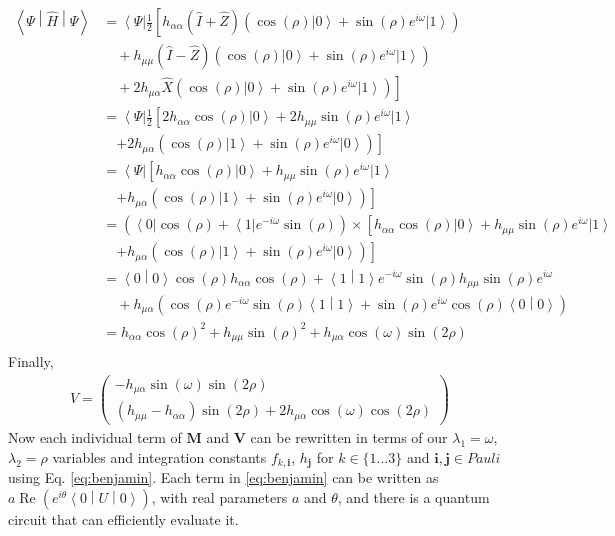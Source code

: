 \documentclass{aux/ttuthes2007}
\newcommand{\bra}[1]{\ensuremath{\left\langle#1\right\vert}}
\newcommand{\ket}[1]{\ensuremath{\left|#1\right\rangle}}
\newcommand{\braket}[2]{\left< #1 \middle\vert #2 \right>}
\newcommand{\sandwich}[3]{\left< #1 \middle\vert #2 \middle\vert #3 \right>}
\newcommand{\s}[1]{\sin\left( #1 \right)}
\newcommand{\co}[1]{\cos\left( #1 \right)}
\newcommand{\paren}[1]{\left( #1 \right)}
\begin{document}
\begin{equation*}
	\begin{split}
		\sandwich \Psi {\hat H} \Psi
		&= \bra \Psi \frac 1 2 \left[
			h_{\alpha\alpha} (\hat I + \hat Z) \paren{\co \rho \ket 0 + \s \rho e^{i\omega} \ket 1} \right .\\
		& \quad + h_{\mu\mu} (\hat I - \hat Z) \paren{\co \rho \ket 0 + \s \rho e^{i\omega} \ket 1} \\
		&\left. \quad + 2 h_{\mu\alpha} \hat X \paren{\co \rho \ket 0 + \s \rho e^{i\omega} \ket 1}
		\right] \\
		&= \bra \Psi \frac 1 2 \left[
			2h_{\alpha\alpha} \co \rho \ket 0 + 2h_{\mu\mu} \s \rho e^{i\omega} \ket 1
		\right .
		\\
		&\quad \left .
			+ 2h_{\mu\alpha} \paren{\co \rho \ket 1 + \s \rho e^{i\omega} \ket 0}
		\right] \\
		&= \bra \Psi \left[
			h_{\alpha\alpha} \co \rho \ket 0 + h_{\mu\mu} \s \rho e^{i\omega} \ket 1
		\right .
		\\
		&\quad \left .
			+ h_{\mu\alpha} \paren{\co \rho \ket 1 + \s \rho e^{i\omega} \ket 0}
		\right] \\
		&= \paren{\bra 0 \co \rho  + \bra 1 e^{-i \omega} \s \rho } 
		\times \left [
			h_{\alpha\alpha} \co \rho \ket 0 + h_{\mu\mu} \s \rho e^{i\omega} \ket 1
		\right .
		\\
		&\quad \left .
			+ h_{\mu\alpha} \paren{\co \rho \ket 1 + \s \rho e^{i\omega} \ket 0}
		\right] \\
		&= \braket 0 0 \co \rho h_{\alpha\alpha} \co \rho 
		+ \braket 1 1 e^{-i \omega} \s \rho h_{\mu\mu} \s \rho e^{i\omega} \\
		&\quad + h_{\mu\alpha} \paren{\co \rho e^{-i \omega} \s \rho \braket 1 1 + \s \rho e^{i\omega} \co \rho \braket 0 0} \\
		&=  h_{\alpha\alpha} \co \rho ^2
		+ h_{\mu\mu} \s \rho ^2
		+ h_{\mu\alpha} \co \omega \s {2\rho}\\
	\end{split}
\end{equation*}
%
Finally,
%
\begin{equation*}
	\begin{split}
		V = \begin{pmatrix}
			- h_{\mu\alpha} \s \omega \s {2\rho} \\
			(h_{\mu\mu} - h_{\alpha\alpha}) \s {2\rho}
			+ 2h_{\mu\alpha} \co \omega \co {2\rho}
		\end{pmatrix}
	\end{split}
\end{equation*}
%
Now each individual term of $\bm M$ and $\bm V$ can be rewritten in terms of our $\lambda_1 = \omega$, $\lambda_2 = \rho$ variables and integration constants $f_{k, \bm i}$, $h_{\bm j}$ for $k \in \{1 \ldots 3\}$ and $\bm i, \bm j \in Pauli$ using Eq. \ref{eq:benjamin}.
%
Each term in \ref{eq:benjamin} can be written as $a\operatorname{Re}\paren{e^{i\theta}\sandwich 0 U 0}$, with real parameters $a$ and $\theta$, and there is a quantum circuit that can efficiently evaluate it.
%
%
\end{document}
